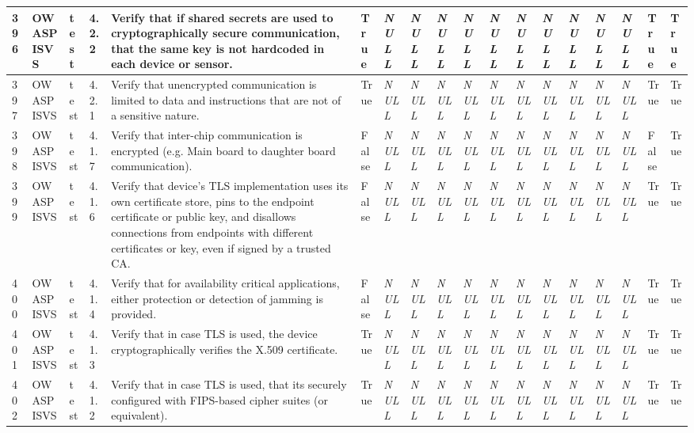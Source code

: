 \begin{longtable}{|l|l|l|l|l|l|l|l|l|l|l|l|l|l|l|l|l|l|}
396 & OWASP ISVS & test & 4.2.2 & Verify that if shared secrets are used to cryptographically secure communication, that the same key is not hardcoded in each device or sensor. & True & \textit{NULL} & \textit{NULL} & \textit{NULL} & \textit{NULL} & \textit{NULL} & \textit{NULL} & \textit{NULL} & \textit{NULL} & \textit{NULL} & \textit{NULL} & True & True \\ \hline 
397 & OWASP ISVS & test & 4.2.1 & Verify that unencrypted communication is limited to data and instructions that are not of a sensitive nature. & True & \textit{NULL} & \textit{NULL} & \textit{NULL} & \textit{NULL} & \textit{NULL} & \textit{NULL} & \textit{NULL} & \textit{NULL} & \textit{NULL} & \textit{NULL} & True & True \\ \hline 
398 & OWASP ISVS & test & 4.1.7 & Verify that inter-chip communication is encrypted (e.g. Main board to daughter board communication). & False & \textit{NULL} & \textit{NULL} & \textit{NULL} & \textit{NULL} & \textit{NULL} & \textit{NULL} & \textit{NULL} & \textit{NULL} & \textit{NULL} & \textit{NULL} & False & True \\ \hline 
399 & OWASP ISVS & test & 4.1.6 & Verify that device's TLS implementation uses its own certificate store, pins to the endpoint certificate or public key, and disallows connections from endpoints with different certificates or key, even if signed by a trusted CA. & False & \textit{NULL} & \textit{NULL} & \textit{NULL} & \textit{NULL} & \textit{NULL} & \textit{NULL} & \textit{NULL} & \textit{NULL} & \textit{NULL} & \textit{NULL} & True & True \\ \hline 
400 & OWASP ISVS & test & 4.1.4 & Verify that for availability critical applications, either protection or detection of jamming is provided. & False & \textit{NULL} & \textit{NULL} & \textit{NULL} & \textit{NULL} & \textit{NULL} & \textit{NULL} & \textit{NULL} & \textit{NULL} & \textit{NULL} & \textit{NULL} & True & True \\ \hline 
401 & OWASP ISVS & test & 4.1.3 & Verify that in case TLS is used, the device cryptographically verifies the X.509 certificate. & True & \textit{NULL} & \textit{NULL} & \textit{NULL} & \textit{NULL} & \textit{NULL} & \textit{NULL} & \textit{NULL} & \textit{NULL} & \textit{NULL} & \textit{NULL} & True & True \\ \hline 
402 & OWASP ISVS & test & 4.1.2 & Verify that in case TLS is used, that its securely configured with FIPS-based cipher suites (or equivalent). & True & \textit{NULL} & \textit{NULL} & \textit{NULL} & \textit{NULL} & \textit{NULL} & \textit{NULL} & \textit{NULL} & \textit{NULL} & \textit{NULL} & \textit{NULL} & True & True \\ \hline 

\end{longtable}

